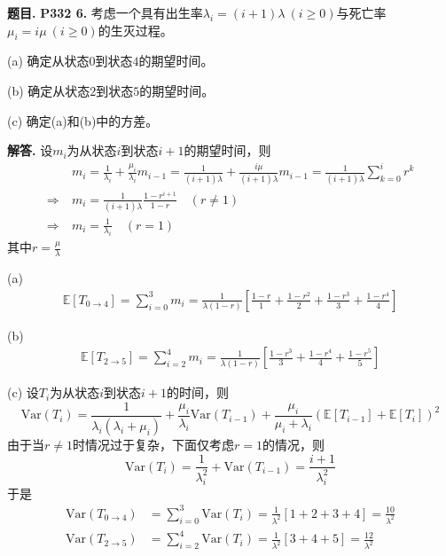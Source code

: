 \documentclass[12pt, a4paper, oneside]{ctexart}
\newcounter{problem}  %
\newenvironment{problem}[1][]{\stepcounter{problem}\par\noindent\textbf{题目\arabic{problem}. #1}}{\smallskip\par}
\newenvironment{solution}[1][]{\par\noindent\textbf{#1解答. }}{\smallskip\par}  %
\def\E{\mathbb{E}}          %
\def\var{\textrm{Var}}      %
\begin{document}
\begin{problem}
    \textbf{P332 6.}
    考虑一个具有出生率$\lambda_i = (i+1)\lambda\ (i\geqslant 0)$与死亡率$\mu_i = i\mu\ (i\geqslant 0)$的生灭过程。
    
    (a) 确定从状态$0$到状态$4$的期望时间。

    (b) 确定从状态$2$到状态$5$的期望时间。

    (c) 确定(a)和(b)中的方差。
\end{problem}
\begin{solution}
    设$m_i$为从状态$i$到状态$i+1$的期望时间，则
    \begin{align*}
        &\ m_i = \frac{1}{\lambda_i}+\frac{\mu_i}{\lambda_i}m_{i-1} = \frac{1}{(i+1)\lambda} + \frac{i\mu}{(i+1)\lambda}m_{i-1} = \frac{1}{(i+1)\lambda}\sum_{k=0}^i r^k \\
        \Rightarrow &\ m_i = \frac{1}{(i+1)\lambda}\frac{1-r^{i+1}}{1-r}\quad(r\neq 1) \\
        \Rightarrow &\ m_i = \frac{1}{\lambda_i}\quad (r=1)
    \end{align*}
    其中$r = \frac{\mu}{\lambda}$

    (a) \vspace{-4ex}
    \begin{align*}
        \E[T_{0\to 4}] = \sum_{i=0}^3 m_i = \frac{1}{\lambda (1-r)}\left[\frac{1-r}{1}+\frac{1-r^2}{2}+\frac{1-r^3}{3}+\frac{1-r^4}{4}\right]
    \end{align*}

    (b) \vspace{-4ex}
    \begin{align*}
        \E[T_{2\to 5}] = \sum_{i=2}^4 m_i = \frac{1}{\lambda (1-r)}\left[\frac{1-r^3}{3}+\frac{1-r^4}{4}+\frac{1-r^5}{5}\right]
    \end{align*}

    (c) 设$T_i$为从状态$i$到状态$i+1$的时间，则
    \begin{equation*}
        \var(T_i) = \frac{1}{\lambda_i(\lambda_i+\mu_i)} + \frac{\mu_i}{\lambda_i}\var(T_{i-1}) + \frac{\mu_i}{\mu_i+\lambda_i}(\E[T_{i-1}]+\E[T_i])^2
    \end{equation*}
    由于当$r\neq 1$时情况过于复杂，下面仅考虑$r=1$的情况，则
    \begin{equation*}
        \var(T_i) = \frac{1}{\lambda_i^2}+\var(T_{i-1}) = \frac{i+1}{\lambda_i^2}
    \end{equation*}
    于是
    \begin{align*}
        \var(T_{0\to 4}) &= \sum_{i=0}^3 \var(T_i) = \frac{1}{\lambda^2}\left[1+2+3+4\right] = \frac{10}{\lambda^2} \\
        \var(T_{2\to 5}) &= \sum_{i=2}^4 \var(T_i) = \frac{1}{\lambda^2}\left[3+4+5\right] = \frac{12}{\lambda^2}
    \end{align*}
\end{solution}
\end{document}

